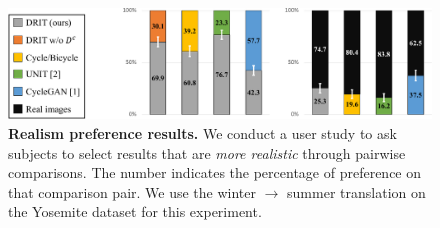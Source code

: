 \documentclass[runningheads]{llncs}
\begin{document}
\begin{figure}[t]
	\centering
    \includegraphics[width=\linewidth]{Figures/realism.pdf}
    \caption{\textbf{Realism preference results.} 
    We conduct a user study to ask subjects to select results that are \emph{more realistic} through pairwise comparisons.
    The number indicates the percentage of preference on that comparison pair. 
    We use the winter $\rightarrow$ summer translation on the Yosemite dataset for this experiment.}
    \label{figure:realism}
    \vspace{-5mm}
 \end{figure}
\end{document}
